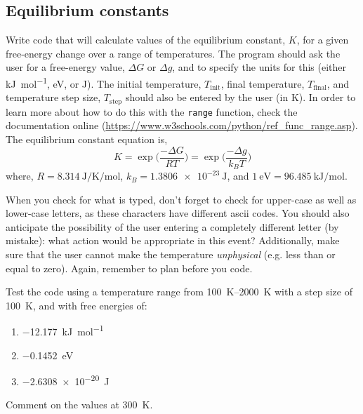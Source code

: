 \documentclass[a4paper]{article}
\begin{document}
\subsection{Equilibrium constants}

Write code that will calculate values of the equilibrium constant, $K$, for a given free-energy change over a range of temperatures.
The program should ask the user for a free-energy value, $\Delta G$ or $\Delta g$, and to specify the units for this (either \si{\kilo\joule\per\mol}, \si{\eV}, or \si{\joule}).
The initial temperature, $T_{\text{init}}$, final temperature, $T_{\text{final}}$, and temperature step size, $T_{\text{step}}$ should also be entered by the user (in \si{\kelvin}).
In order to learn more about how to do this with the \texttt{range} function, check the documentation online (\url{https://www.w3schools.com/python/ref_func_range.asp}).
The equilibrium constant equation is,
\begin{equation}
	K = \exp{\bigg(\frac{-\Delta G}{RT}\bigg)} = \exp{\bigg(\frac{-\Delta g}{k_BT}\bigg)}
\end{equation}
where, $R = \SI{8.314}{\joule\per\kelvin\per\mol}$, $k_B = \SI{1.3806e-23}{\joule}$, and $\SI{1}{\eV} = \SI{96.485}{\kilo\joule\per\mol}$.

When you check for what is typed, don’t forget to check for upper-case as well as lower-case letters, as these characters have different ascii codes.
You should also anticipate the possibility of the user entering a completely different letter (by mistake): what action would be appropriate in this event?
Additionally, make sure that the user cannot make the temperature \emph{unphysical} (e.g. less than or equal to zero).
Again, remember to plan before you code.

Test the code using a temperature range from \SIrange{100}{2000}{\kelvin} with a step size of \SI{100}{\kelvin}, and with free energies of:
\begin{enumerate}
	\item{\SI{-12.177}{\kilo\joule\per\mol}}
	\item{\SI{-0.1452}{\eV}}
	\item{\SI{-2.6308e-20}{\joule}}
\end{enumerate}
Comment on the values at \SI{300}{\kelvin}.

%
%
\end{document}
